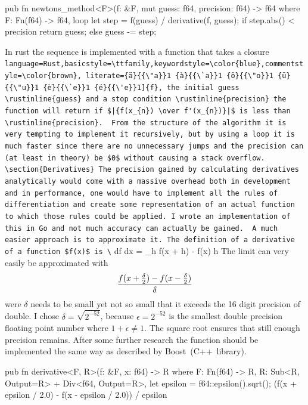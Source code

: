 \documentclass[11pt,DIV=10,final]{scrreprt} %
\providecommand{\rustinline}{\lstinline[language=Rust,basicstyle=\ttfamily,keywordstyle=\color{blue},commentstyle=\color{brown}, literate={ä}{{\"a}}1 {à}{{\`a}}1 {ö}{{\"o}}1 {ü}{{\"u}}1 {è}{{\`e}}1 {é}{{\'e}}1]} % für Inline-C++ Code
\begin{document}
\begin{rustcode}
pub fn newtons_method<F>(f: &F, mut guess: f64, precision: f64) -> f64
    where
        F: Fn(f64) -> f64,
{
    loop {
        let step = f(guess) / derivative(f, guess);
        if step.abs() < precision {
            return guess;
        } else {
            guess -= step;
        }
    }
}
\end{rustcode}

In rust the sequence is implemented with a function that takes a closure \rustinline{f}, the initial guess \rustinline{guess} and a stop condition \rustinline{precision} the function will return if
$|{f(x_{n}) \over f'(x_{n})}|$ is less than \rustinline{precision}.

From the structure of the algorithm it is very tempting to implement it recursively, but by using a loop it is much faster since there are no unnecessary jumps and the precision can (at least in theory) be $0$ without causing a stack overflow.

\section{Derivatives}
The precision gained by calculating derivatives analytically would come with a massive overhead both in development and in performance, one would have to implement all the rules of differentiation and create some representation of an actual function to which those rules could be applied. I wrote an implementation of this in Go and not much accuracy can actually be gained.

A much easier approach is to approximate it. The definition of a derivative of a function $f(x)$ is
\[
  {df \over dx} = \lim_{h }{f(x + h) - f(x) \over h}
\]
The limit can very easily be approximated with
\[
  {f(x + \frac{\delta}{2}) - f(x - \frac{\delta}{2}) \over \delta}
\]
were $\delta$ needs to be small yet not so small that it exceeds the 16 digit precision of double. I chose $\delta = \sqrt{2^{-52}}$, because $\epsilon = 2^{-52}$ is the smallest double precision floating point number where
$1 + \epsilon \ne 1$. The square root ensures that still enough precision remains. After some further research the function should be implemented the same way as described by Boost~(C++~library).

\begin{rustcode}
pub fn derivative<F, R>(f: &F, x: f64) -> R
    where
        F: Fn(f64) -> R,
        R: Sub<R, Output=R> + Div<f64, Output=R>,
{
    let epsilon = f64::epsilon().sqrt();
    (f(x + epsilon / 2.0) - f(x - epsilon / 2.0)) / epsilon
}
\end{rustcode}
\end{document}

